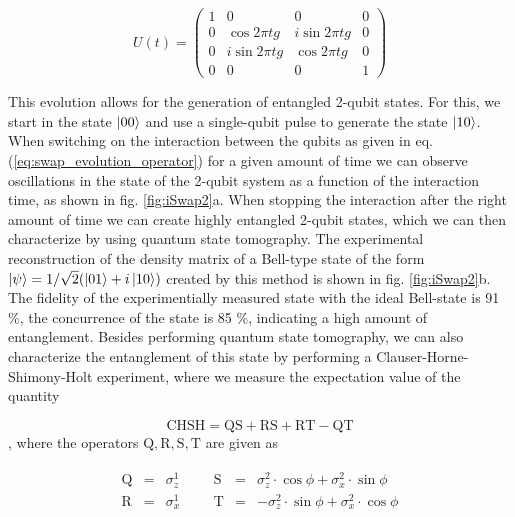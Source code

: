 \begin{equation}
	U(t)  =  \left( \begin{array}{cccc} 1 & 0 & 0 & 0 \\ 0 & \cos{2 \pi t g} & i\sin{2 \pi t g} & 0 \\ 0 & i\sin{2 \pi t g} & \cos{2 \pi t g} & 0 \\ 0 & 0 & 0 & 1 \end{array} \right) \label{eq:swap_evolution_operator}
\end{equation}

This evolution allows for the generation of entangled 2-qubit states. For this, we start in the state $\left| 00 \right>$ and use a single-qubit pulse to generate the state $\left| 10 \right>$. When switching on the interaction between the qubits as given in eq. (\ref{eq:swap_evolution_operator}) for a given amount of time we can observe oscillations in the state of the 2-qubit system as a function of the interaction time, as shown in fig. \ref{fig:iSwap2}a. When stopping the interaction after the right amount of time we can create highly entangled 2-qubit states, which we can then characterize by using quantum state tomography. The experimental reconstruction of the density matrix of a Bell-type state of the form $\left| \psi \right> = 1/\sqrt{2}(\left| 01 \right>+i\left| 10 \right>)$ created by this method is shown in fig. \ref{fig:iSwap2}b. The fidelity of the experimentially measured state with the ideal Bell-state is 91 \%, the concurrence of the state is 85 \%, indicating a high amount of entanglement. Besides performing quantum state tomography, we can also characterize the entanglement of this state by performing a Clauser-Horne-Shimony-Holt experiment\citep{clauser_proposed_1969}, where we measure the expectation value of the quantity

\begin{equation}
\mathrm{CHSH} = \mathrm{QS}+\mathrm{RS}+\mathrm{RT}-\mathrm{QT}
\end{equation}
, where the operators $\mathrm{Q,R,S,T}$ are given as

\begin{eqnarray}
	\begin{array}{cccccccc}
		\mathrm{Q} & = & \sigma_z^1 &&& \mathrm{S} & = & \sigma_z^2\cdot \cos{\phi}+\sigma_x^2 \cdot \sin{\phi} \\
		\mathrm{R} & = & \sigma_x^1 &&& \mathrm{T} & = & -\sigma_z^2\cdot \sin{\phi}+\sigma_x^2 \cdot \cos{\phi}
	\end{array}
\end{eqnarray} 

